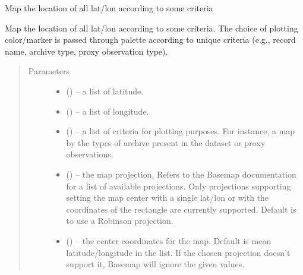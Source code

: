 \documentclass[letterpaper,10pt,english]{sphinxmanual}
\begin{document}
\begin{fulllineitems}
\label{\detokenize{Map:pyleoclim.Map.mapAll}}
Map the location of all lat/lon according to some criteria

Map the location of all lat/lon according to some criteria. The choice of
plotting color/marker is passed through palette according to unique
criteria (e.g., record name, archive type, proxy observation type).
\begin{quote}\begin{description}
\item[{Parameters}] \leavevmode\begin{itemize}
\item {} 
 () -- a list of latitude.

\item {} 
 () -- a list of longitude.

\item {} 
 () -- a list of criteria for plotting purposes. For instance,
a map by the types of archive present in the dataset or proxy
observations.

\item {} 
 () -- the map projection. Refers to the Basemap
documentation for a list of available projections. Only projections
supporting setting the map center with a single lat/lon or with
the coordinates of the rectangle are currently supported.
Default is to use a Robinson projection.

\item {} 
 (\sphinxstyleliteralemphasis{,}\sphinxstyleliteralemphasis{}) -- the center coordinates for the map. Default is
mean latitude/longitude in the list.
If the chosen projection doesn't support it, Basemap will
ignore the given values.


\end{itemize}
\end{description}
\end{quote}
\end{fulllineitems}
\end{document}
